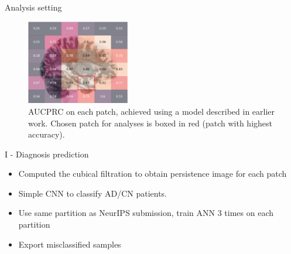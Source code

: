 \documentclass[aspectratio=169, 10pt, dvipsnames]{beamer}
\begin{document}
\begin{frame}[fragile]{Analysis setting}
\begin{figure}
  \centering
  \includegraphics[width=0.4\textwidth]{figures/patch_performance.png}
  \caption{AUCPRC on each patch, achieved using a model described in earlier work. Chosen patch for analyses is boxed in red (patch with highest accuracy).}
\end{figure}
\end{frame}

\begin{frame}[fragile]{I - Diagnosis prediction}
  \begin{itemize}
  \item Computed the cubical filtration to obtain persistence image for each patch
  \item Simple CNN to classify AD/CN patients.
  \item Use same partition as NeurIPS submission, train ANN 3 times on each partition
  \item Export misclassified samples
  \end{itemize}
\end{frame}
\end{document}
